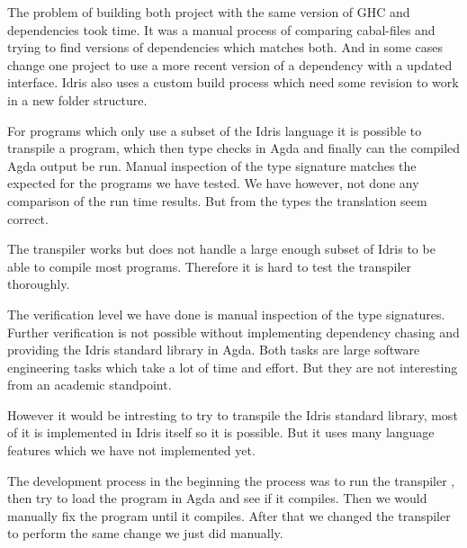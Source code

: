 The problem of building both project with the same version of GHC and
dependencies took time. It was a manual process of comparing cabal-files and
trying to find versions of dependencies which matches both. And in some cases
change one project to use a more recent version of a dependency with a updated
interface. Idris also uses a custom build process which need some revision to
work in a new folder structure.


For programs which only use a subset of the Idris
language it is possible to transpile a program, which then type checks in Agda
and finally can the compiled Agda output be run. Manual inspection of the type
signature matches the expected for the programs we have tested. We have
however, not done any comparison of the run time results. But from the types
the translation seem correct.

The transpiler works but does not handle a large enough subset of Idris to be
able to compile most programs. Therefore it is hard to test the
transpiler thoroughly.


The verification level we have done is manual inspection of the type
signatures. Further verification is not possible without implementing
dependency chasing and providing the Idris standard library in Agda. Both tasks
are large software engineering tasks which take a lot of time and effort. But
they are not interesting from an academic standpoint.

However it would be intresting to try to transpile the Idris standard library,
most of it is implemented in Idris itself so it is possible. But it uses many
language features which we have not implemented yet.

The development process in the beginning the process was to run the transpiler
, then try to load the program in Agda and see if it compiles.  Then we would
manually fix the program until it compiles.  After that we changed the
transpiler to perform the same change we just did manually.

